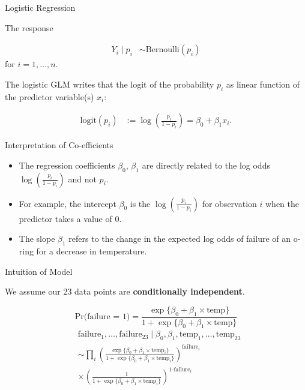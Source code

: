 \documentclass[
  ignorenonframetext,
]{beamer}
\begin{document}
\begin{frame}{Logistic Regression}
\protect\hypertarget{logistic-regression}{}

The response

\begin{align}
Y_i \mid p_i &\sim \text{Bernoulli}(p_i)
\end{align} for \(i=1,\ldots,n.\)

The logistic GLM writes that the logit of the probability \(p_i\) as
linear function of the predictor variable(s) \(x_i\):

\begin{align}
\text{logit}(p_i)  &:= \log(\frac{p_i}{1-p_i}) = \beta_0 + \beta_1x_i.
\end{align}

\end{frame}

\begin{frame}{Interpretation of Co-efficients}
\protect\hypertarget{interpretation-of-co-efficients}{}

\begin{itemize}
\item
  The regression coefficients \(\beta_0\), \(\beta_1\) are directly
  related to the log odds \(\log(\frac{p_i}{1-p_i})\) and not \(p_i.\)
\item
  For example, the intercept \(\beta_0\) is the
  \(\log(\frac{p_i}{1-p_i})\) for observation \(i\) when the predictor
  takes a value of 0.
\item
  The slope \(\beta_1\) refers to the change in the expected log odds of
  failure of an o-ring for a decrease in temperature.
\end{itemize}

\end{frame}

\begin{frame}{Intuition of Model}
\protect\hypertarget{intuition-of-model}{}

We assume our 23 data points are \textbf{conditionally independent}.

\[\text{Pr(failure = 1)} = \frac{\exp\{\beta_0 + \beta_1 \times \text{temp}\}}{1+ \exp\{\beta_0 + \beta_1 \times \text{temp}\}}\]
\begin{align}
&\text{failure}_1,\ldots, \text{failure}_{23} \mid \beta_0, \beta_1, \text{temp}_1,\ldots, \text{temp}_{23} \\
& \sim 
\prod_i 
\left(\frac{\exp\{\beta_0 + \beta_1 \times \text{temp}_i\}}{1+ \exp\{\beta_0 + \beta_1 \times \text{temp}_i\}}\right)^{\text{failure}_i} \\
&\times
\left(\frac{1}{1+ \exp\{\beta_0 + \beta_1 \times \text{temp}_i\}}\right)^{\text{1-failure}_i}
\end{align}

\end{frame}
\end{document}
